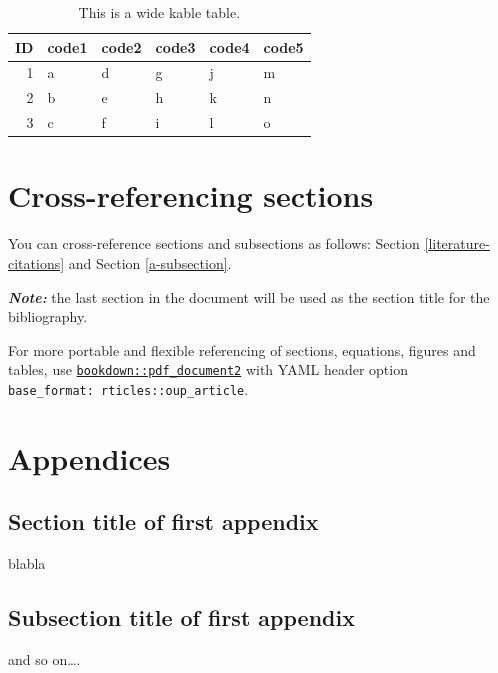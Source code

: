 \documentclass[webpdf,large,contemporary,namedate]{oup-authoring-template}
\theoremstyle{thmstyleone}
\theoremstyle{thmstyletwo}
\theoremstyle{thmstylethree}
\begin{document}
\begin{table}

\caption{\label{tab:tab3}This is a wide kable table.}
\centering
\begin{tabular}[t]{rlllll}
\toprule
ID & code1 & code2 & code3 & code4 & code5\\
\midrule
1 & a & d & g & j & m\\
2 & b & e & h & k & n\\
3 & c & f & i & l & o\\
\bottomrule
\end{tabular}
\end{table}

\hypertarget{cross-referencing-sections}{%
\section{Cross-referencing sections}\label{cross-referencing-sections}}

You can cross-reference sections and subsections as follows: Section
\ref{literature-citations} and Section \ref{a-subsection}.

\textbf{\emph{Note:}} the last section in the document will be used as
the section title for the bibliography.

For more portable and flexible referencing of sections, equations,
figures and tables, use
\href{https://github.com/rstudio/bookdown}{\texttt{bookdown::pdf\_document2}}
with YAML header option \texttt{base\_format:\ rticles::oup\_article}.

\hypertarget{appendices}{%
\section*{Appendices}\label{appendices}}

\begin{appendices}

\hypertarget{section-title-of-first-appendix}{%
\section{Section title of first
appendix}\label{section-title-of-first-appendix}}

blabla

\hypertarget{subsection-title-of-first-appendix}{%
\subsection{Subsection title of first
appendix}\label{subsection-title-of-first-appendix}}

and so on\ldots.

\end{appendices}
\end{document}
